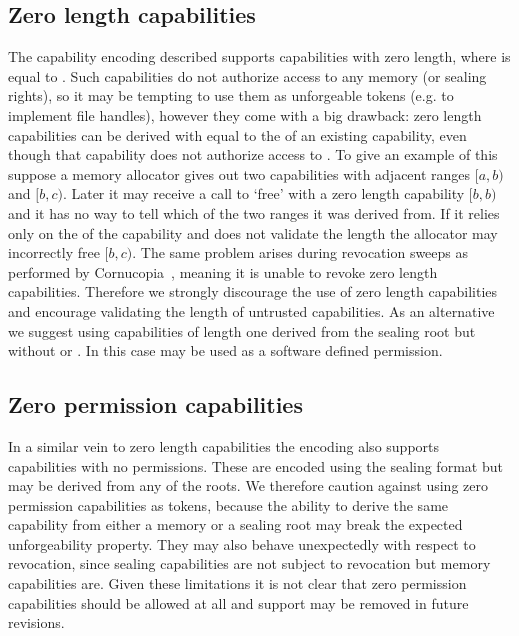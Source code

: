 \subsection{Zero length capabilities}
\label{sec:zerolengthcaps}

The capability encoding described supports capabilities with zero length, where \cbase{} is equal to \ctop{}.
Such capabilities do not authorize access to any memory (or sealing rights), so it may be tempting to use them as unforgeable tokens (e.g. to implement file handles), however they come with a big drawback:
zero length capabilities can be derived with \cbase{} equal to the \ctop{} of an existing capability, even though that capability does not authorize access to \ctop{}.
To give an example of this suppose a memory allocator gives out two capabilities with adjacent ranges $[a,b)$ and $[b,c)$.
Later it may receive a call to `free' with a zero length capability $[b,b)$ and it has no way to tell which of the two ranges it was derived from.
If it relies only on the \cbase{} of the capability and does not validate the length the allocator may incorrectly free $[b,c)$.
The same problem arises during revocation sweeps as performed by Cornucopia~\cite{cornucopia}, meaning it is unable to revoke zero length capabilities.
Therefore we strongly discourage the use of zero length capabilities and encourage validating the length of untrusted capabilities.
As an alternative we suggest using capabilities of length one derived from the sealing root but without \cappermSeal or \cappermUnseal.
In this case \cappermUZ may be used as a software defined permission.


\subsection{Zero permission capabilities}

In a similar vein to zero length capabilities the encoding also supports capabilities with no permissions.
These are encoded using the sealing format but may be derived from any of the roots.
We therefore caution against using zero permission capabilities as tokens, because the ability to derive the same capability from either a memory or a sealing root may break the expected unforgeability property.
They may also behave unexpectedly with respect to revocation, since sealing capabilities are not subject to revocation but memory capabilities are.
Given these limitations it is not clear that zero permission capabilities should be allowed at all and support may be removed in future revisions.

